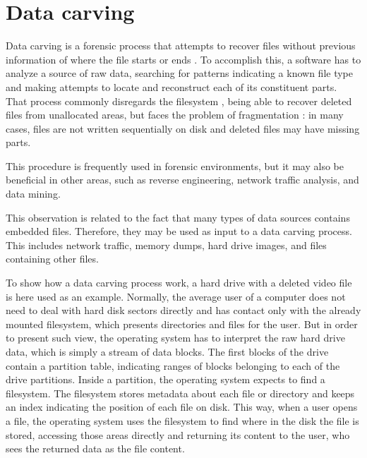 \section{\label{sec:datacarving}Data carving}
Data carving is a forensic process that attempts to recover files without previous information of where the file starts or ends \cite{garfinkel_carving_2007}.
To accomplish this, a software has to analyze a source of raw data, searching for patterns indicating a known file type and making attempts to locate and reconstruct each of its constituent parts.
That process commonly disregards the filesystem \cite{veenman_statistical_2007}, being able to recover deleted files from unallocated areas, but faces the problem of fragmentation \cite{veenman_statistical_2007}  \cite{pal_evolution_2009}: in many cases, files are not written sequentially on disk and deleted files may have missing parts.

This procedure is frequently used in forensic environments, but it may also be beneficial in other areas, such as reverse engineering, network traffic analysis, and data mining.

This observation is related to the fact that many types of data sources contains embedded files. Therefore, they may be used as input to a data carving process. This includes network traffic, memory dumps, hard drive images, and files containing other files.



 To show how a data carving process work, a hard drive with a deleted video file is here used as an example.
 Normally, the average user of a computer does not need to deal with hard disk sectors directly and has contact only with the already mounted filesystem, which presents directories and files for the user. But in order to present such view, the operating system has to interpret the raw hard drive data, which is simply a stream of data blocks. The first blocks of the drive contain a partition table, indicating ranges of blocks belonging to each of the drive partitions. Inside a partition, the operating system expects to find a filesystem. The filesystem stores metadata about each file or directory and keeps an index indicating the position of each file on disk. This way, when a user opens a file, the operating system uses the filesystem to find where in the disk the file is stored, accessing those areas directly and returning its content to the user, who sees the returned data as the file content. 
 

